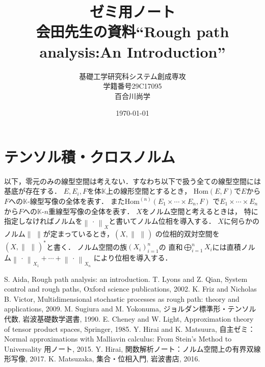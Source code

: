 \documentclass[a4j,10.5pt,oneside,openany]{jsbook}
\title{ゼミ用ノート\\会田先生の資料``Rough path analysis:An Introduction''}
\author{基礎工学研究科システム創成専攻\\学籍番号29C17095\\百合川尚学}
\date{\today}
\theoremstyle{mystyle}
\def\Norm#1#2{\left\|\, #1\, \right\|_{#2}} %
\def\K{\mathbb{K}} %
\def\Hom#1#2{\mathrm{Hom} \left(#1,#2\right)} %
\def\Ln#1#2#3{\mathrm{Hom}^{(#3)} \left(#1,#2\right)} %
\begin{document}
\maketitle
\tableofcontents
\frontmatter
\mainmatter

\chapter{}
	
	
	

\appendix
\chapter{テンソル積・クロスノルム}
	以下，零元のみの線型空間は考えない．すなわち以下で扱う全ての線型空間には基底が存在する．
	$E,E_i,F$を体$\K$上の線形空間とするとき，
	$\Hom{E}{F}$で$E$から$F$への$\K$-線型写像の全体を表す．
	また$\Ln{E_1 \times \cdots \times E_n}{F}{n}$
	で$E_1 \times \cdots \times E_n$から$F$への$\K$-$n$重線型写像の全体を表す．
	$X$をノルム空間と考えるときは，
	特に指定しなければノルムを$\Norm{\cdot}{X}$と書いてノルム位相を導入する．
	$X$に何らかのノルム$\Norm{}{}$が定まっているとき，$(X,\Norm{}{})$
	の位相的双対空間を$(X,\Norm{}{})^*$と書く．
	ノルム空間の族$(X_i)_{i=1}^{n}$の
	直和$\bigoplus_{i=1}^n X_i$には直積ノルム$\Norm{\cdot}{X_1} + \cdots + \Norm{\cdot}{X_n}$
	により位相を導入する．
	
	
	
	
	
	

\begin{thebibliography}{数字}
   S. Aida, Rough path analysis: an introduction.
   T. Lyons and Z. Qian, System control and rough paths, Oxford science publications, 2002.
   K. Friz and Nicholas B. Victor, Multidimensional stochastic processes as rough path: theory and applications, 2009.
   M. Sugiura and M. Yokonuma, ジョルダン標準形・テンソル代数, 岩波基礎数学選書, 1990.
   E. Cheney and W. Light, Approximation theory of tensor product spaces, Springer, 1985.
   Y. Hirai and K. Matsuura, 自主ゼミ： Normal approximations with Malliavin calculus: From Stein's Method to Universality 用ノート, 2015. 
   Y. Hirai, 関数解析ノート：ノルム空間上の有界双線形写像, 2017.
   K. Matsuzaka, 集合・位相入門, 岩波書店, 2016.
\end{thebibliography}

\printindex
\end{document}
